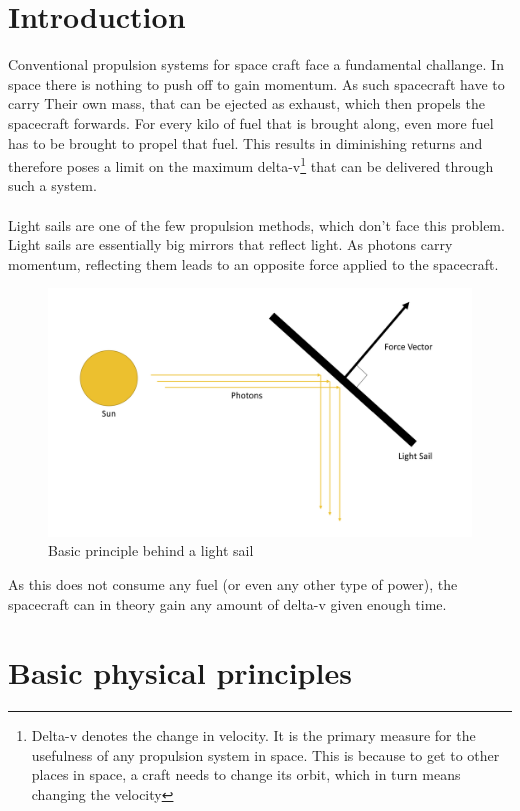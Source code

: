 \documentclass[14pt]{article}
\begin{document}
\section{Introduction}
Conventional propulsion systems for space craft face a fundamental challange. 
In space there is nothing to push off to gain momentum. As such spacecraft have to carry Their
own mass, that can be ejected as exhaust, which then propels the spacecraft forwards. For every kilo
of fuel that is brought along, even more fuel has to be brought to propel that fuel. This results in
diminishing returns and therefore poses a limit on the maximum delta-v\footnote{Delta-v denotes the change in velocity.
It is the primary measure for the usefulness of any propulsion system in space. This is because to get to other places in space,
a craft needs to change its orbit, which in turn means changing the velocity} that can be delivered through
such a system\autocite{dunbar}.\\
\\
Light sails are one of the few propulsion methods, which don't face this problem. Light sails are essentially big mirrors that reflect
light. As photons carry momentum, reflecting them leads to an opposite force applied to the spacecraft.

\begin{figure}[H]
  \includegraphics[width=14cm]{./resources/solar_sail.png}
  \caption{Basic principle behind a light sail}
  \label{fig:sail_principle}
\end{figure}

As this does not consume any fuel (or even any other type of power), the spacecraft can in theory gain any amount of delta-v given enough time.

\section{Basic physical principles}
\end{document}
